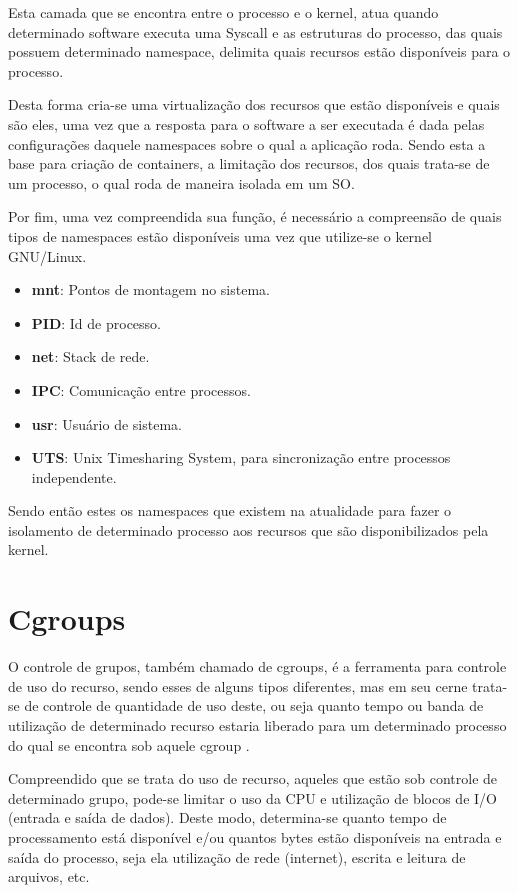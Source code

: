 Esta camada que se encontra entre o processo e o kernel, atua quando determinado software executa uma Syscall e as estruturas do processo, das quais possuem determinado namespace, delimita quais recursos estão disponíveis para o processo.

Desta forma cria-se uma virtualização dos recursos que estão disponíveis e quais são eles, uma vez que a resposta para o software a ser executada é dada pelas configurações daquele namespaces sobre o qual a aplicação roda. Sendo esta a base para criação de containers, a limitação dos recursos, dos quais trata-se de um processo, o qual roda de maneira isolada em um SO.

Por fim, uma vez compreendida sua função, é necessário a compreensão de quais tipos de namespaces estão disponíveis uma vez que utilize-se o kernel GNU/Linux.

\begin{itemize}
    \item \textbf{mnt}: Pontos de montagem no sistema.
    \item \textbf{PID}: Id de processo.
    \item \textbf{net}: Stack de rede.
    \item \textbf{IPC}: Comunicação entre processos.
    \item \textbf{usr}: Usuário de sistema.
    \item \textbf{UTS}: Unix Timesharing System, para sincronização entre processos independente.
\end{itemize}

Sendo então estes os namespaces que existem na atualidade para fazer o isolamento de determinado processo aos recursos que são disponibilizados pela kernel.

\section{Cgroups}
\label{chp:referencial_teorico::sct:cgroup}
O controle de grupos, também chamado de cgroups, é a ferramenta para controle de uso do recurso, sendo esses de alguns tipos diferentes, mas em seu cerne trata-se de controle de quantidade de uso deste, ou seja quanto tempo ou banda de utilização de determinado recurso estaria liberado para um determinado processo do qual se encontra sob aquele cgroup \cite{kernelscheepers, secrypt22}.

Compreendido que se trata do uso de recurso, aqueles que estão sob controle de determinado grupo, pode-se limitar o uso da CPU e utilização de blocos de I/O (entrada e saída de dados). Deste modo, determina-se quanto tempo de processamento está disponível e/ou quantos bytes estão disponíveis na entrada e saída do processo, seja ela utilização de rede (internet), escrita e leitura de arquivos, etc.

